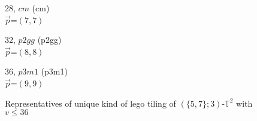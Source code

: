 \documentclass{beamer}
\begin{document}
\begin{frame}
\begin{figure}
\begin{center}
\begin{minipage}[b]{2.4cm}
\par 
28, $cm$ (cm)\\
$\vec{p}$=$(7,7)$
 \end{minipage}
\begin{minipage}[b]{2.7cm}\centering
{}
\par 32, $p2gg$ (p2gg)\\
$\vec{p}$=$(8,8)$ \end{minipage}
\begin{minipage}[b]{2.7cm}\centering
{}
\par 36, $p3m1$ (p3m1)\\
$\vec{p}$=$(9,9)$
\end{minipage}



\end{center}
Representatives of unique kind of  lego tiling of 
$(\{5,7\};3)$-$\mathbb{T}^2$
with 
$v\le 36$
\end{figure}
\end{frame}
\end{document}
